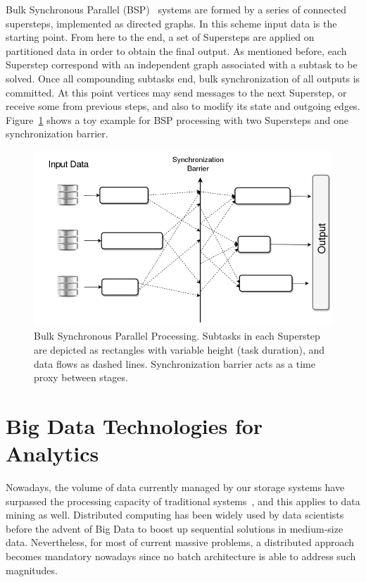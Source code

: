 \documentclass[3p,review]{elsarticle}
\begin{document}
Bulk Synchronous Parallel (BSP)~\cite{vali90} systems are formed by a series of connected supersteps, implemented as directed graphs. In this scheme input data is the starting point. From here to the end, a set of Supersteps are applied on partitioned data in order to obtain the final output. As mentioned before, each Superstep correspond with an independent graph associated with a subtask to be solved. Once all compounding subtasks end, bulk synchronization of all outputs is committed. At this point vertices may send messages to the next Superstep, or receive some from previous steps, and also to modify its state and outgoing edges. Figure~\ref{fig:bsp} shows a toy example for BSP processing with two Supersteps and one synchronization barrier.

\begin{figure}[htp]
    \centering
    \includegraphics[height=0.3\textheight]{bsp}
    \caption{Bulk Synchronous Parallel Processing. Subtasks in each Superstep are depicted as rectangles with variable height (task duration), and data flows as dashed lines. Synchronization barrier acts as a time proxy between stages.}
    \label{fig:bsp}
\end{figure}

\section{Big Data Technologies for Analytics}\label{sec:techno}


Nowadays, the volume of data currently managed by our storage systems have surpassed the processing capacity of traditional systems~\cite{wu14}, and this applies to data mining as well. Distributed computing has been widely used by data scientists before the advent of Big Data to boost up sequential solutions in medium-size data. Nevertheless, for most of current massive problems, a distributed approach becomes mandatory nowadays since no batch architecture is able to address such magnitudes.
\end{document}
